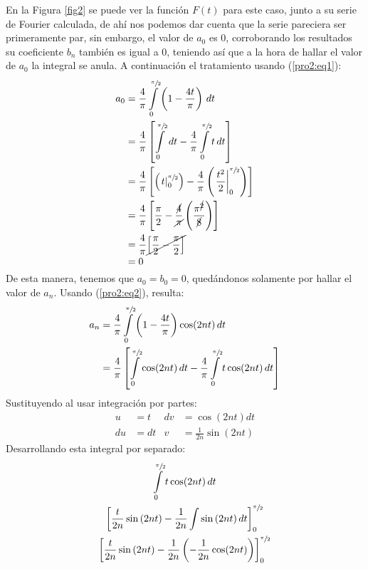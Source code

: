 \begin{multicols}{2}
En la Figura \ref{fig2} se puede ver la función $F(t)$ para este caso, junto a su serie de Fourier calculada, de ahí nos podemos dar cuenta que la serie pareciera ser primeramente par, sin embargo, el valor de $a_0$ es 0, corroborando los resultados su coeficiente $b_n$ también es igual a 0, teniendo así que a la hora de hallar el valor de $a_0$ la integral se anula. A continuación el tratamiento usando (\ref{pro2:eq1}):
\begin{align*}
    a_0 &= \frac{4}{\pi} \int\limits_{0}^{\sfrac{\pi}{2}} \left(1 - \frac{4t}{\pi}\right) \,dt\\
    &= \frac{4}{\pi} \left[\int\limits_{0}^{\sfrac{\pi}{2}} \,dt - \frac{4}{\pi} \int\limits_{0}^{\sfrac{\pi}{2}} t \,dt\right]\\
    &= \frac{4}{\pi} \left[\left(\left. t \right|_{0}^{\sfrac{\pi}{2}}\right) - \frac{4}{\pi}\left(\left.\frac{t^{2}}{2}\right|_{0}^{\sfrac{\pi}{2}}\right)\right]\\
    &= \frac{4}{\pi} \left[\frac{\pi}{2} - \frac{\cancel{4}}{\cancel{\pi}}\left(\frac{\pi^{\cancel{2}}}{\cancel{8}}\right)\right]\\
    &= \frac{4}{\pi} \cancel{\left[\frac{\pi}{2} - \frac{\pi}{2}\right]}\\
    &= 0
\end{align*}
De esta manera, tenemos que $a_0 = b_0 = 0$, quedándonos solamente por hallar el valor de $a_n$. Usando (\ref{pro2:eq2}), resulta:
\begin{align*}
    a_n &= \frac{4}{\pi} \int\limits_{0}^{\sfrac{\pi}{2}} \left(1 - \frac{4t}{\pi}\right) \cos(2nt) \,dt\\
    &= \frac{4}{\pi} \left[\int\limits_{0}^{\sfrac{\pi}{2}} \cos(2nt) \,dt - \frac{4}{\pi} \int\limits_{0}^{\sfrac{\pi}{2}} t \cos(2nt) \,dt\right]
\end{align*}
Sustituyendo al usar integración por partes:
\begin{align*}
    u&=t          &  dv&=\cos\left(2nt\right) dt\\
    du&=dt         &  v&=\frac{1}{2n} \sin\left(2nt\right)
\end{align*}
Desarrollando esta integral por separado:
\begin{gather*}
    \int\limits_{0}^{\sfrac{\pi}{2}} t \cos(2nt) \,dt\\
    \left[\frac{t}{2n} \sin\left(2nt\right) - \frac{1}{2n} \int \sin\left(2nt\right) dt\right]_{0}^{\sfrac{\pi}{2}}\\
    \left[\frac{t}{2n} \sin\left(2nt\right) - \frac{1}{2n} \left(-\frac{1}{2n}\cos(2nt)\right)\right]_{0}^{\sfrac{\pi}{2}}\\

\end{gather*}
\end{multicols}
